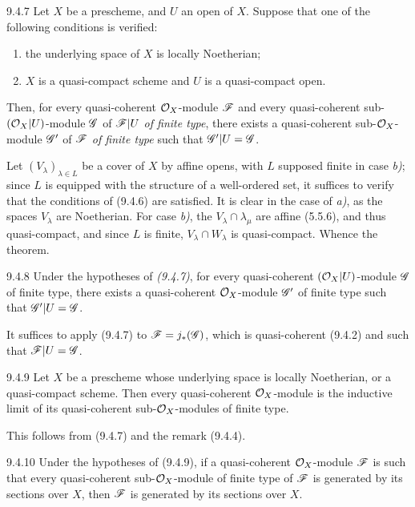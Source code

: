 \documentclass[../main.tex]{subfiles}
\begin{document}
\begin{cx}[Theorem]{9.4.7}
    Let $X$ be a prescheme, and $U$ an open of $X$.
    Suppose that one of the following conditions is verified:
    \begin{enumerate}[label=\normalfont\alph*)]
        \item the underlying space of $X$ is locally Noetherian;
        \item $X$ is a quasi-compact scheme and $U$ is a quasi-compact open.
    \end{enumerate}
    Then, for every quasi-coherent $\mathcal{O}_X$-module $\mathscr{F}$ and every quasi-coherent sub-$(\mathcal{O}_X|U)$-module $\mathscr{G}$ of $\mathscr{F}|U$ \emph{of finite type}, there exists a quasi-coherent sub-$\mathcal{O}_X$-module $\mathscr{G}'$ of $\mathscr{F}$ \emph{of finite type} such that $\mathscr{G}'|U=\mathscr{G}$.
\end{cx}

Let $(V_\lambda)_{\lambda\in L}$ be a cover of $X$ by affine opens, with $L$ supposed finite in case \emph{b)}; since $L$ is equipped with the structure of a well-ordered set, it suffices to verify that the conditions of (9.4.6) are satisfied.
It is clear in the case of \emph{a)}, as the spaces $V_\lambda$ are Noetherian.
For case \emph{b)}, the $V_\lambda\cap\lambda_\mu$ are affine (5.5.6), and thus quasi-compact, and since $L$ is finite, $V_\lambda\cap W_\lambda$ is quasi-compact.
Whence the theorem.

\begin{cx}[Corollary]{9.4.8}
    Under the hypotheses of \emph{(9.4.7)}, for every quasi-coherent $(\mathcal{O}_X|U)$-module $\mathscr{G}$ of finite type, there exists a quasi-coherent $\mathcal{O}_X$-module $\mathscr{G}'$ of finite type such that $\mathscr{G}'|U=\mathscr{G}$.
\end{cx}

It suffices to apply (9.4.7) to $\mathscr{F}=j_*(\mathscr{G})$, which is quasi-coherent (9.4.2) and such that $\mathscr{F}|U=\mathscr{G}$.

\begin{cx}[Corollary]{9.4.9}
    Let $X$ be a prescheme whose underlying space is locally Noetherian, or a quasi-compact scheme.
    Then every quasi-coherent $\mathcal{O}_X$-module is the inductive limit of its quasi-coherent sub-$\mathcal{O}_X$-modules of finite type.
\end{cx}

This follows from (9.4.7) and the remark (9.4.4).

\begin{cx}[Corollary]{9.4.10}
    Under the hypotheses of (9.4.9), if a quasi-coherent $\mathcal{O}_X$-module $\mathscr{F}$ is such that every quasi-coherent sub-$\mathcal{O}_X$-module of finite type of $\mathscr{F}$ is generated by its sections over $X$, then $\mathscr{F}$ is generated by its sections over $X$.
\end{cx}
\end{document}
